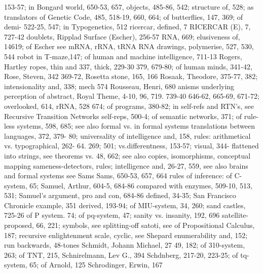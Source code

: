                                           153-57; in Bongard world, 650-53, 657,
objects, 485-86, 542; structure of, 528; as
translators of Genetic Code, 485, 518-19, 660,
                                          664; of butterflies, 147, 369; of demi-
522-25, 547; in Typogenetics, 512 ricercar,
defined, 7 RICERCAR (E), 7, 727-42        doublets,
Ripplad Surface (Escher), 256-57 RNA,     669; elusiveness of, 14619; of Escher
see mRNA, rRNA, tRNA RNA                  drawings,
polymerise, 527, 530, 544 robot in T-maze,147; of human and machine intelligence,
711-13 Rogers, Hartley ropes, thin and    337,
thick, 229-30                             379, 679-80; of human minds, 341-42,
Rose, Steven, 342                         369-72,
Rosetta stone, 165, 166 Rosaak, Theodore, 375-77, 382; intensionality and, 338; mech
574 Rousseau, Henri, 680                  anisms underlying perception of abstract,
Royal Theme, 4-10, 96, 719. 739-40        646-62, 665-69, 671-72; overlooked, 614,
rRNA, 528                                 674; of programs, 380-82; in self-refs and
RTN's, see Recursive Transition Networks  self-reps,
                                          500-4; of semantic networks, 371; of
rule-less systems, 598, 685; see also formal
vs. in formal systems                     translations between languages, 372, 379-
                                          80; universality of intelligence and, 158,
rules: arithmetical vs. typographical, 262-
64. 269;                                  501; vs.differentness, 153-57; visual, 344-
flattened into strings, see theorems vs.  48, 662; see also copies, isomorphisms,
                                          conceptual mapping sameness-detectors,
rules; intelligence and, 26-27, 559, see also
brains and formal systems                 see Sams Sams, 650-53, 657, 664
rules of inference: of C-system, 65;      Samuel, Arthur, 604-5, 684-86
compared with enzymes, 509-10, 513, 531;  Samuel's argument, pro and con, 684-86
defined, 34-35;                           San Francisco Chronicle example, 351
derived, 193-94; of MIU-system, 34, 260;  sand castles, 725-26
of P system. 74; of pq-system, 47;        sanity vs. insanity, 192, 696 satellite-
proposed, 66, 221;                        symbols, see splitting-off satoti, see
of Propositional Calculus, 187; recursive enlightenment scale, cyclic, see Shepard
enumerability and, 152; run backwards, 48-tones Schmidt, Johann Michael, 27
49, 182; of 310-system, 263; of TNT, 215, Schnirelmann, Lev G., 394 Schdnberg,
217-20, 223-25; of tq-system, 65; of      Arnold, 125 Schrodinger, Erwin, 167
